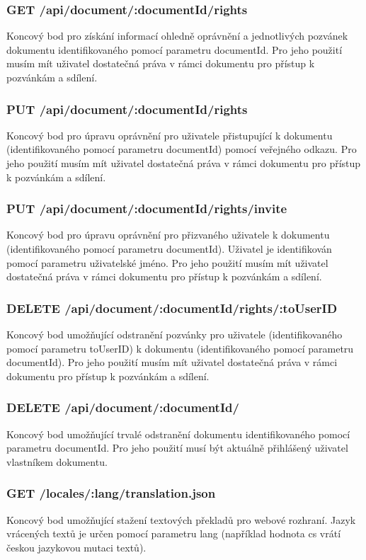 \subsubsection{GET /api/document/:documentId/rights}

Koncový bod pro získání informací ohledně oprávnění a jednotlivých pozvánek dokumentu identifikovaného pomocí parametru documentId.
Pro jeho použití musím mít uživatel dostatečná práva v rámci dokumentu pro přístup k pozvánkám a sdílení.

\subsubsection{PUT /api/document/:documentId/rights}

Koncový bod pro úpravu oprávnění pro uživatele přistupující k dokumentu (identifikovaného pomocí parametru documentId) pomocí veřejného odkazu.
Pro jeho použití musím mít uživatel dostatečná práva v rámci dokumentu pro přístup k pozvánkám a sdílení.

\subsubsection{PUT /api/document/:documentId/rights/invite}

Koncový bod pro úpravu oprávnění pro přizvaného uživatele k dokumentu (identifikovaného pomocí parametru documentId).
Uživatel je identifikován pomocí parametru uživatelské jméno.
Pro jeho použití musím mít uživatel dostatečná práva v rámci dokumentu pro přístup k pozvánkám a sdílení.

\subsubsection{DELETE /api/document/:documentId/rights/:toUserID}

Koncový bod umožňující odstranění pozvánky pro uživatele (identifikovaného pomocí parametru toUserID) k dokumentu (identifikovaného pomocí parametru documentId).
Pro jeho použití musím mít uživatel dostatečná práva v rámci dokumentu pro přístup k pozvánkám a sdílení.

\subsubsection{DELETE /api/document/:documentId/}

Koncový bod umožňující trvalé odstranění dokumentu identifikovaného pomocí parametru documentId.
Pro jeho použití musí být aktuálně přihlášený uživatel vlastníkem dokumentu.

\subsubsection{GET /locales/:lang/translation.json}

Koncový bod umožňující stažení textových překladů pro webové rozhraní.
Jazyk vrácených textů je určen pomocí parametru lang (například hodnota cs vrátí českou jazykovou mutaci textů).
